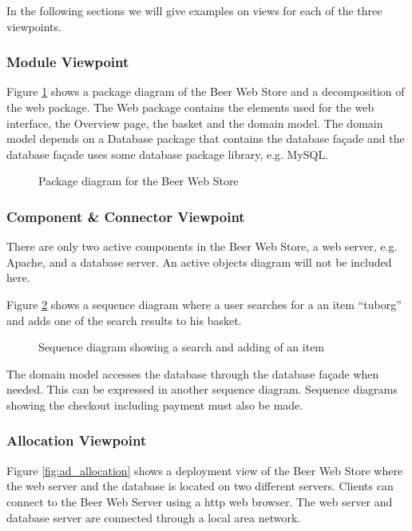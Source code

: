 In the following sections we will give examples on views for each
of the three viewpoints.

\subsubsection{Module Viewpoint}

Figure \ref{fig:ad_package} shows a package diagram of the Beer Web
Store and a decomposition of the web package. The Web package
contains the elements used for the web interface, 
the Overview page, the basket and the domain model. The domain model
depends on a Database package that contains the database fa\c cade and the
database fa\c cade uses some database package library, e.g. MySQL.

\begin{figure}[!htb]
\centerline{}
\caption{Package diagram for the Beer Web Store}
\label{fig:ad_package}
\end{figure}

\subsubsection{Component \& Connector Viewpoint}

There are only two active components in the Beer Web Store, a web server,
e.g. Apache, and a database server. An active objects diagram will
not be included here.

Figure \ref{fig:ad_sequence} shows a sequence diagram where a user searches
for a an item ``tuborg'' and adds one of the search results to his basket.

\begin{figure}[!htb]
\centerline{}
\caption{Sequence diagram showing a search and adding of an item}
\label{fig:ad_sequence}
\end{figure}

The domain model accesses the database through the database fa\c cade
when needed. This can be expressed in another sequence diagram.
Sequence diagrams showing the checkout including payment must
also be made.

\subsubsection{Allocation Viewpoint}

Figure \ref{fig:ad_allocation} shows a deployment view of the Beer
Web Store where the web server and the database is located on two
different servers. Clients can connect to the Beer Web Server
using a http web browser. The web server and database server
are connected through a local area network.

